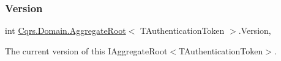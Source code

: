 \subsubsection{\texorpdfstring{Version}{Version}}
{\footnotesize\ttfamily int \hyperlink{classCqrs_1_1Domain_1_1AggregateRoot}{Cqrs.\+Domain.\+Aggregate\+Root}$<$ T\+Authentication\+Token $>$.Version\hspace{0.3cm}{\ttfamily [get]}, {}}



The current version of this I\+Aggregate\+Root$<$\+T\+Authentication\+Token$>$. 

